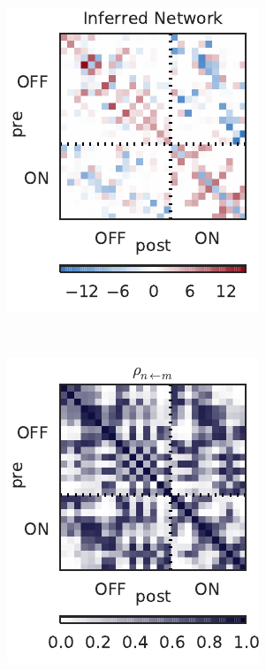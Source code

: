 \begin{figure}[t!]
\begin{subfigure}[b]{1.85in}
    \includegraphics[width=\textwidth]{figures/ch3/rgc_connectivity.pdf}
    \label{fig:rgc_w}
  \end{subfigure}
  ~
    \begin{subfigure}[b]{1.85in}
    \centering
    \caption{}
    \vspace{-.2in}
    \includegraphics[width=\textwidth]{figures/ch3/rgc_prob_conn.pdf}

\end{subfigure}
\end{figure}
